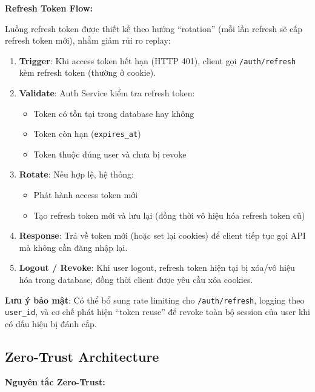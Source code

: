 \noindent\textbf{Refresh Token Flow:}

Luồng refresh token được thiết kế theo hướng ``rotation'' (mỗi lần refresh sẽ cấp refresh token mới), nhằm giảm rủi ro replay:
\begin{enumerate}
    \item \textbf{Trigger}: Khi access token hết hạn (HTTP 401), client gọi \texttt{/auth/refresh} kèm refresh token (thường ở cookie).
    \item \textbf{Validate}: Auth Service kiểm tra refresh token:
    \begin{itemize}
        \item Token có tồn tại trong database hay không
        \item Token còn hạn (\texttt{expires\_at})
        \item Token thuộc đúng user và chưa bị revoke
    \end{itemize}
    \item \textbf{Rotate}: Nếu hợp lệ, hệ thống:
    \begin{itemize}
        \item Phát hành access token mới
        \item Tạo refresh token mới và lưu lại (đồng thời vô hiệu hóa refresh token cũ)
    \end{itemize}
    \item \textbf{Response}: Trả về token mới (hoặc set lại cookies) để client tiếp tục gọi API mà không cần đăng nhập lại.
    \item \textbf{Logout / Revoke}: Khi user logout, refresh token hiện tại bị xóa/vô hiệu hóa trong database, đồng thời client được yêu cầu xóa cookies.
\end{enumerate}

\noindent\textbf{Lưu ý bảo mật}: Có thể bổ sung rate limiting cho \texttt{/auth/refresh}, logging theo \texttt{user\_id}, và cơ chế phát hiện ``token reuse'' để revoke toàn bộ session của user khi có dấu hiệu bị đánh cắp.

\subsection{Zero-Trust Architecture}

\noindent\textbf{Nguyên tắc Zero-Trust:}


